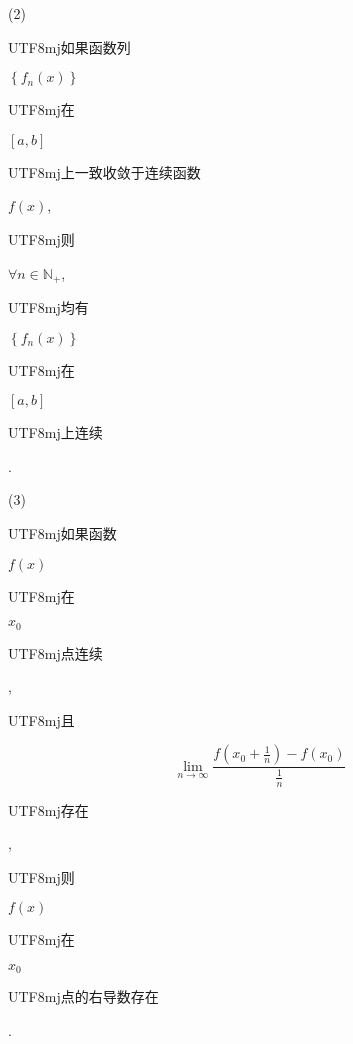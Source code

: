\documentclass[10pt]{article}
\begin{document}
(2) \begin{CJK}{UTF8}{mj}如果函数列\end{CJK} $\left\{f_{n}(x)\right\}$ \begin{CJK}{UTF8}{mj}在\end{CJK} $[a, b]$ \begin{CJK}{UTF8}{mj}上一致收敛于连续函数\end{CJK} $f(x)$, \begin{CJK}{UTF8}{mj}则\end{CJK} $\forall n \in \mathbb{N}_{+}$, \begin{CJK}{UTF8}{mj}均有\end{CJK} $\left\{f_{n}(x)\right\}$ \begin{CJK}{UTF8}{mj}在\end{CJK} $[a, b]$ \begin{CJK}{UTF8}{mj}上连续\end{CJK}.

(3) \begin{CJK}{UTF8}{mj}如果函数\end{CJK} $f(x)$ \begin{CJK}{UTF8}{mj}在\end{CJK} $x_{0}$ \begin{CJK}{UTF8}{mj}点连续\end{CJK}, \begin{CJK}{UTF8}{mj}且\end{CJK}
$$
\lim _{n \rightarrow \infty} \frac{f\left(x_{0}+\frac{1}{n}\right)-f\left(x_{0}\right)}{\frac{1}{n}}
$$
\begin{CJK}{UTF8}{mj}存在\end{CJK}, \begin{CJK}{UTF8}{mj}则\end{CJK} $f(x)$ \begin{CJK}{UTF8}{mj}在\end{CJK} $x_{0}$ \begin{CJK}{UTF8}{mj}点的右导数存在\end{CJK}.
\end{document}
